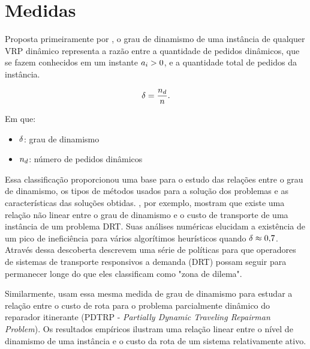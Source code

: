 \chapter{Medidas}\label{ch:medidas}



Proposta primeiramente por , o grau de dinamismo
de uma instância de qualquer VRP dinâmico representa a razão entre a quantidade
de pedidos dinâmicos, que se fazem conhecidos em um instante
$a_i > 0$, e a quantidade total de pedidos da instância.

\begin{equation}
  \delta = \frac{n_{d}}{n}.
  \label{eq:degreeOfDynamism}
\end{equation}

Em que:
\begin{itemize}
  \item $\delta$: grau de dinamismo
  \item $n_{d}$: número de pedidos dinâmicos
\end{itemize}

\iffalse
Essa classificação proporcionou uma base para o estudo das relações entre o 
grau de dinamismo, os tipos de métodos usados para a solução dos 
problemas e as características das soluções obtidas.
, por exemplo, mostram que existe uma relação não
linear entre o grau de dinamismo e o custo de transporte de uma instância de um
problema DRT.
Suas análises numéricas elucidam a existência de um pico de ineficiência para
vários algorítimos heurísticos quando $\delta \approx 0{,}7$.
Através dessa descoberta  descrevem uma série de
políticas para que operadores de sistemas de transporte responsivos a demanda
(DRT) possam seguir para permanecer longe do que eles classificam como "zona de
dilema".

Similarmente,  usam essa mesma medida de 
grau de dinamismo para estudar a relação entre o custo de rota para o 
problema parcialmente dinâmico do reparador itinerante 
(PDTRP - \textit{Partially Dynamic Traveling Repairman Problem}).
Os resultados empíricos ilustram uma relação linear entre o nível de
dinamismo de uma instância e o custo da rota de um sistema relativamente ativo.


